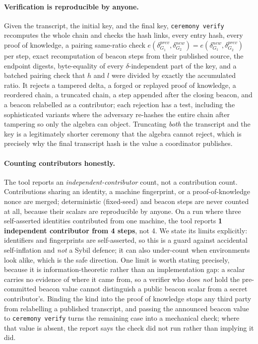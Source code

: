 \documentclass[10pt]{article}
\newcommand{\code}[1]{\texttt{#1}}
\begin{document}
\paragraph{Verification is reproducible by anyone.} Given the transcript, the initial
key, and the final key, \code{ceremony verify} recomputes the whole chain and checks
the hash links, every entry hash, every proof of knowledge, a pairing same-ratio
check $e(\delta_{G_1}^{prev}, \delta_{G_2}^{new}) = e(\delta_{G_1}^{new},
\delta_{G_2}^{prev})$ per step, exact recomputation of beacon steps from their
published source, the endpoint digests, byte-equality of every $\delta$-independent
part of the key, and a batched pairing check that $h$ and $l$ were divided by exactly
the accumulated ratio. It rejects a tampered delta, a forged or replayed proof of
knowledge, a reordered chain, a truncated chain, a step appended after the closing
beacon, and a beacon relabelled as a contributor; each rejection has a test,
including the sophisticated variants where the adversary re-hashes the entire chain
after tampering so only the algebra can object. Truncating \emph{both} the transcript
and the key is a legitimately shorter ceremony that the algebra cannot reject, which
is precisely why the final transcript hash is the value a coordinator publishes.

\paragraph{Counting contributors honestly.} The tool reports an
\emph{independent-contributor} count, not a contribution count. Contributions sharing
an identity, a machine fingerprint, or a proof-of-knowledge nonce are merged;
deterministic (fixed-seed) and beacon steps are never counted at all, because their
scalars are reproducible by anyone. On a run where three self-asserted identities
contributed from one machine, the tool reports \textbf{1 independent contributor from
4 steps}, not 4. We state its limits explicitly: identifiers and fingerprints are
self-asserted, so this is a guard against accidental self-inflation and
\emph{not} a Sybil defence; it can also under-count when environments look alike,
which is the safe direction. One limit is worth stating precisely, because it is
information-theoretic rather than an implementation gap: a scalar carries no evidence
of where it came from, so a verifier who does \emph{not} hold the pre-committed
beacon value cannot distinguish a public beacon scalar from a secret contributor's.
Binding the kind into the proof of knowledge stops any third party from relabelling a
published transcript, and passing the announced beacon value to \code{ceremony verify}
turns the remaining case into a mechanical check; where that value is absent, the
report says the check did not run rather than implying it did.
\end{document}

